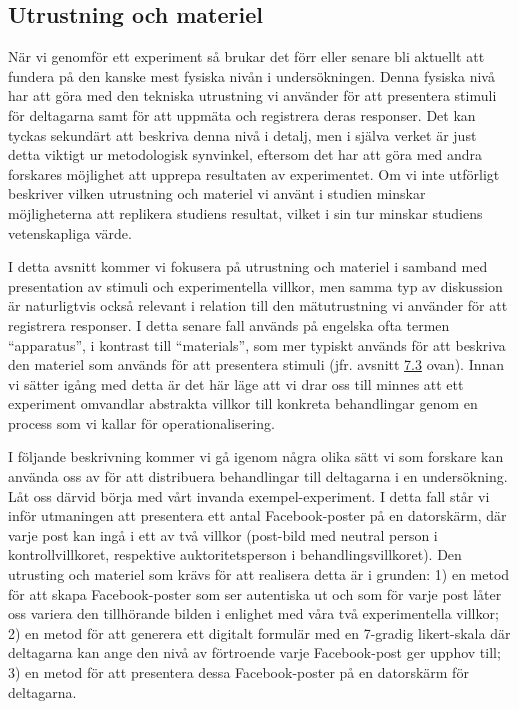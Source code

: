 \documentclass[
]{book}
\begin{document}
\hypertarget{sub07.4.5}{%
\subsection{Utrustning och materiel}\label{sub07.4.5}}

När vi genomför ett experiment så brukar det förr eller senare bli aktuellt att fundera på den kanske mest fysiska nivån i undersökningen. Denna fysiska nivå har att göra med den tekniska utrustning vi använder för att presentera stimuli för deltagarna samt för att uppmäta och registrera deras responser. Det kan tyckas sekundärt att beskriva denna nivå i detalj, men i själva verket är just detta viktigt ur metodologisk synvinkel, eftersom det har att göra med andra forskares möjlighet att upprepa resultaten av experimentet. Om vi inte utförligt beskriver vilken utrustning och materiel vi använt i studien minskar möjligheterna att replikera studiens resultat, vilket i sin tur minskar studiens vetenskapliga värde.

I detta avsnitt kommer vi fokusera på utrustning och materiel i samband med presentation av stimuli och experimentella villkor, men samma typ av diskussion är naturligtvis också relevant i relation till den mätutrustning vi använder för att registrera responser. I detta senare fall används på engelska ofta termen ``apparatus'', i kontrast till ``materials'', som mer typiskt används för att beskriva den materiel som används för att presentera stimuli (jfr. avsnitt \protect\hyperlink{sec07.3}{7.3} ovan). Innan vi sätter igång med detta är det här läge att vi drar oss till minnes att ett experiment omvandlar abstrakta villkor till konkreta behandlingar genom en process som vi kallar för operationalisering.

I följande beskrivning kommer vi gå igenom några olika sätt vi som forskare kan använda oss av för att distribuera behandlingar till deltagarna i en undersökning. Låt oss därvid börja med vårt invanda exempel-experiment. I detta fall står vi inför utmaningen att presentera ett antal Facebook-poster på en datorskärm, där varje post kan ingå i ett av två villkor (post-bild med neutral person i kontrollvillkoret, respektive auktoritetsperson i behandlingsvillkoret). Den utrusting och materiel som krävs för att realisera detta är i grunden: 1) en metod för att skapa Facebook-poster som ser autentiska ut och som för varje post låter oss variera den tillhörande bilden i enlighet med våra två experimentella villkor; 2) en metod för att generera ett digitalt formulär med en 7-gradig likert-skala där deltagarna kan ange den nivå av förtroende varje Facebook-post ger upphov till; 3) en metod för att presentera dessa Facebook-poster på en datorskärm för deltagarna.
\end{document}
